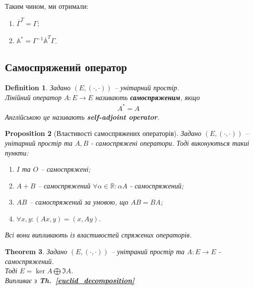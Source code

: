 \documentclass[a4paper, 10pt]{article}
\theoremstyle{theoremdd}
\newtheorem{theorem}{Theorem}[subsection]
\newtheorem{definition}[theorem]{Definition}
\newtheorem{proposition}[theorem]{Proposition}
\newtheorem{remark}[theorem]{Remark}
\newcommand\thref[1]{\textbf{Th.~\ref{#1}}}
\begin{document}
\bigskip \\
Таким чином, ми отримали:
\begin{enumerate}[nosep,wide=0pt,label={\arabic*)}]
\item  $\overline{\Gamma}^T = \Gamma$;
\item $\mathbb{A^*} = \Gamma^{-1} \mathbb{\overline{A}}^T \Gamma$.
\end{enumerate}

\iffalse
\begin{remark}
Тепер в евкілдовому просторі нехай $\{e_1,\dots,e_n\}$ - ортонормований базис. Тоді $\Gamma = \mathbb{I}$, а отже, $\mathbb{A^*} = \mathbb{\overline{A}}^T$.
\end{remark}
\fi

\subsection{Самоспряжений оператор}
\begin{definition}
Задано $(E,(\cdot,\cdot))$ -- унітарний простір.\\
Лінійний оператор $A \colon E \to E$ називають \textbf{самоспряженим}, якщо
\begin{align*}
A^* = A
\end{align*}
Англійською це називають \textbf{self-adjoint operator}.
\end{definition}

\begin{proposition}[Властивості самоспряжених операторів]
Задано $(E,(\cdot,\cdot))$ -- унітарний простір та $A,B$ - самоспряжені оператори. Тоді виконуються такиі пункти:
\begin{enumerate}[nosep,wide=0pt,label={\arabic*)},start=0]
\item $I$ та $O$ -- самоспряжені;
\item $A+B$ -- самоспряжений \qquad $\forall \alpha \in \mathbb{R}: \alpha A$ - самоспряжений;
\item $AB$ -- самоспряжений за умовою, що $AB = BA$;
\item $\forall x,y: (Ax,y) = (x,Ay)$.
\end{enumerate}
\textit{Всі вони випливають із властивостей спряжених операторів.}
\end{proposition}

\begin{theorem}
\label{euclid_decomposition_2}
Задано $(E,(\cdot,\cdot))$ -- унітраний простір та $A \colon E \to E$ - самоспряжений.\\
Тоді $E = \ker A \bigoplus \Im A$.\\
\textit{Випливає з } \thref{euclid_decomposition}
\end{theorem}
\end{document}
